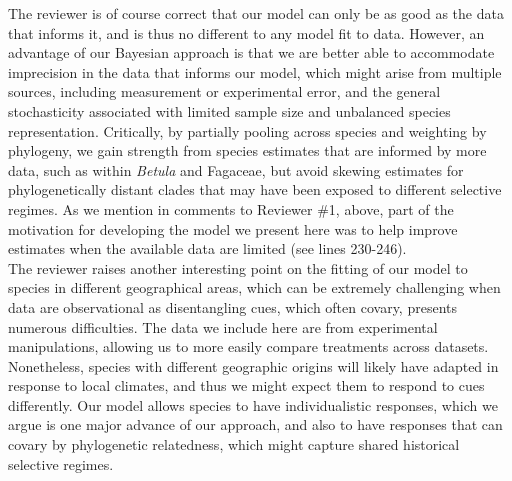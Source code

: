 \documentclass[11pt]{article}
\begin{document}
The reviewer is of course correct that our model can only be as good as the data that informs it, and is thus no different to any model fit to data. However, an advantage of our Bayesian approach is that we are better able to accommodate imprecision in the data that informs our model, which might arise from multiple sources, including measurement or experimental error, and the general stochasticity associated with limited sample size and unbalanced species representation. Critically, by partially pooling across species and weighting by phylogeny, we gain strength from species estimates that are informed by more data, such as within \emph{Betula} and Fagaceae, but avoid skewing estimates for phylogenetically distant clades that may have been exposed to different selective regimes. As we mention in comments to Reviewer \#1, above, part of the motivation for developing the model we present here was to help improve estimates when the available data are limited (see lines 230-246).   %
\\

The reviewer raises another interesting point on the fitting of our model to species in different geographical areas, which can be extremely challenging when data are observational as disentangling cues, which often covary, presents numerous difficulties. The data we include here are from experimental manipulations, allowing us to more easily compare treatments across datasets. Nonetheless, species with different geographic origins will likely have adapted in response to local climates, and thus we might expect them to respond to cues differently. Our model allows species to have individualistic responses, which we argue is one major advance of our approach, and also to have responses that can covary by phylogenetic relatedness, which might capture shared historical selective regimes.\\   
\end{document}
